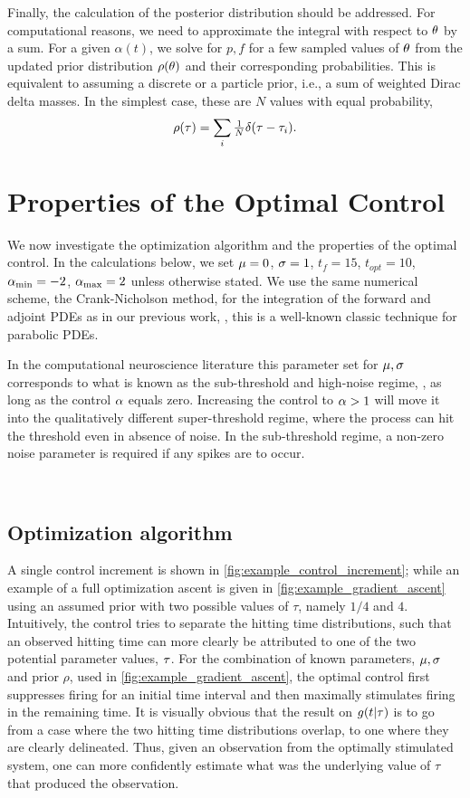 \documentclass{article}
\def \tf {{t_f}}
\def \topt {{ t_{opt}}}
\begin{document}
Finally, the calculation of the posterior distribution should be addressed. For
computational reasons, we need to approximate the integral with respect to ${\theta}$
by a sum. For a given $\alpha(t)$, we solve for $p,f$ for a few sampled values
of ${\theta}$ from the updated prior distribution $\rho({\theta})$ and their corresponding
probabilities. This is equivalent to assuming a discrete or a particle prior,
i.e., a sum of weighted Dirac delta masses. In the simplest case, these are $N$
values with equal probability,
\begin{equation}
\rho({ \tau }) = \sum_i  
	\tfrac 1N \delta({ \tau }- { \tau }_i) .
\label{eq:basic_prior_over_tau}
\end{equation} 
 
\section{Properties of the Optimal Control}
\label{sec:sim_study}
 
We now investigate the optimization algorithm and the properties of the optimal
control. In the calculations below, we set  ${\mu }=0$, ${\sigma } = 1$, $\tf=15$, $\topt =
10$, ${ {\alpha}_{\textrm{min}} }=-2$, ${ {\alpha}_{\textrm{max}} }=2$ unless otherwise stated. 
We use the same numerical scheme, the Crank-Nicholson method, for the
integration of the forward and adjoint PDEs as in our previous work,
\cite{Iolov2014a}, this is a well-known classic technique for parabolic PDEs. 
 
In the computational neuroscience
literature this parameter set for ${\mu },{\sigma }$ corresponds to what is known as the
sub-threshold and high-noise regime, \cite{Iolov2013}, as long as the control ${\alpha}$ equals
zero. Increasing the control to ${\alpha}>1$ will move it into the
qualitatively different 
super-threshold regime, where the process can hit the
threshold even in absence of noise. In the sub-threshold regime, a
non-zero noise parameter is required if any spikes are to occur.

\

\subsection{Optimization algorithm}
A single control increment is shown in \cref{fig:example_control_increment};
while an example of a full optimization ascent is given in
\cref{fig:example_gradient_ascent} using an assumed prior with two possible
values of $\tau$, namely $1/4$ and $4$.
 Intuitively, the control tries to separate the hitting time distributions, such
 that an observed hitting time can more clearly be attributed to one of the two potential parameter values, ${\tau}$.
For the combination of known parameters, ${\mu }, {\sigma }$ and prior $\rho$, used in
\cref{fig:example_gradient_ascent}, the optimal control first suppresses firing
for an initial time interval and then maximally stimulates firing in the
remaining time. It is visually obvious that the result on $g(t|{ \tau })$ is to go
from a case where the two hitting time distributions overlap, to one where they
are clearly delineated. Thus, given an observation from the optimally stimulated
system, one can more confidently estimate what was the underlying value of
$\tau$ that produced the observation.
 
\end{document}
